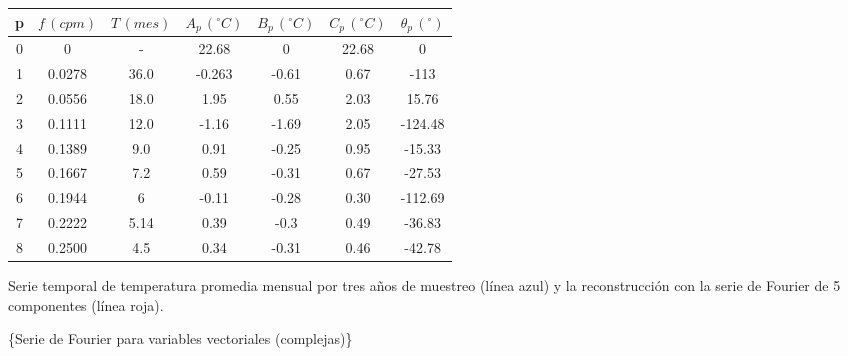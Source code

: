 \documentclass[
]{agujournal2019}
\begin{document}
\begin{center}
\begin{tabular}{c c c c c c c}
p & $f\,(cpm)$ & $T\,(mes)$ & $A_p\,(^\circ C)$ & $B_p\,(^\circ C)$ & $C_p\,(^\circ C)$ & $\theta_p\,(^\circ)$ \\
\hline
0 & 0 & - & 22.68 & 0 & 22.68 & 0\\
1 & 0.0278 & 36.0 & -0.263 & -0.61 & 0.67 & -113\\
2 & 0.0556 & 18.0 & 1.95 & 0.55 & 2.03 & 15.76\\
3 & 0.1111 & 12.0 & -1.16 & -1.69 & 2.05 & -124.48\\
4 & 0.1389 & 9.0 & 0.91 & -0.25 & 0.95 & -15.33\\
5 & 0.1667 & 7.2 & 0.59 & -0.31 & 0.67 & -27.53\\
6 & 0.1944 & 6 & -0.11 & -0.28 & 0.30 & -112.69\\
7 & 0.2222 & 5.14 & 0.39 & -0.3 & 0.49 & -36.83\\
8 & 0.2500 & 4.5 & 0.34 & -0.31 & 0.46 & -42.78\\
\end{tabular}
\end{center}

\begin{center}
\end{center}
\begin{center}
Serie temporal de temperatura promedia mensual por tres años de muestreo (línea azul)
y la reconstrucción con la serie de Fourier de 5 componentes (línea roja).
\end{center}

\vspace{0.25cm}

\{\textbf \large \noindent Serie de Fourier para variables vectoriales
(complejas)\}
\end{document}
